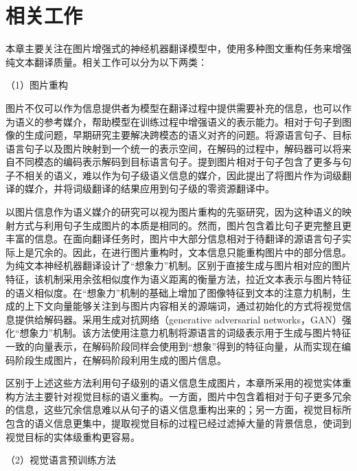 \section{相关工作}
本章主要关注在图片增强式的神经机器翻译模型中，使用多种图文重构任务来增强纯文本翻译质量。相关工作可以分为以下两类：

{\sffamily （1）图片重构}

图片不仅可以作为信息提供者为模型在翻译过程中提供需要补充的信息，也可以作为语义的参考媒介，帮助模型在训练过程中增强语义的表示能力。相对于句子到图像的生成问题，早期研究主要解决跨模态的语义对齐的问题。将源语言句子、目标语言句子以及图片映射到一个统一的表示空间，在解码的过程中，解码器可以将来自不同模态的编码表示解码到目标语言句子。提到图片相对于句子包含了更多与句子不相关的语义，难以作为句子级语义信息的媒介，因此提出了将图片作为词级翻译的媒介，并将词级翻译的结果应用到句子级的零资源翻译中。

以图片信息作为语义媒介的研究可以视为图片重构的先驱研究，因为这种语义的映射方式与利用句子生成图片的本质是相同的。然而，图片包含着比句子更完整且更丰富的信息。在面向翻译任务时，图片中大部分信息相对于待翻译的源语言句子实际上是冗余的。因此，在进行图片重构时，文本信息只能重构图片中的部分信息。为纯文本神经机器翻译设计了“想象力”机制。区别于直接生成与图片相对应的图片特征，该机制采用余弦相似度作为语义距离的衡量方法，拉近文本表示与图片特征的语义相似度。在“想象力”机制的基础上增加了图像特征到文本的注意力机制，生成的上下文向量能够关注到与图片内容相关的源端词，通过初始化的方式将视觉信息提供给解码器。采用生成对抗网络（generative adversarial networks，GAN）强化“想象力”机制。该方法使用注意力机制将源语言的词级表示用于生成与图片特征一致的向量表示，在解码阶段同样会使用到“想象”得到的特征向量，从而实现在编码阶段生成图片，在解码阶段利用生成的图片信息。

区别于上述这些方法利用句子级别的语义信息生成图片，本章所采用的视觉实体重构方法主要针对视觉目标的语义重构。一方面，图片中包含着相对于句子更多冗余的信息，这些冗余信息难以从句子的语义信息重构出来的；另一方面，视觉目标所包含的语义信息更集中，提取视觉目标的过程已经过滤掉大量的背景信息，使词到视觉目标的实体级重构更容易。


{\sffamily （2）视觉语言预训练方法}

